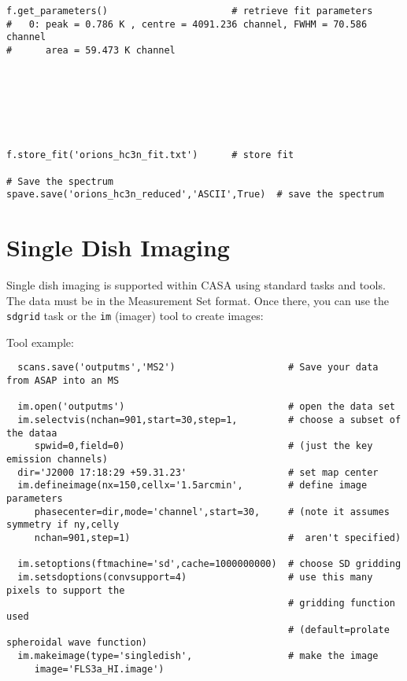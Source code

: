 \small
\begin{verbatim}
f.get_parameters()                      # retrieve fit parameters
#   0: peak = 0.786 K , centre = 4091.236 channel, FWHM = 70.586 channel
#      area = 59.473 K channel
                                                                                        
                                                                                        
                                                                                        
                                                                                        
                                                                                        
                                                                                        

f.store_fit('orions_hc3n_fit.txt')      # store fit                                     

# Save the spectrum
spave.save('orions_hc3n_reduced','ASCII',True)  # save the spectrum                     
\end{verbatim}
\normalsize

\section{Single Dish Imaging}
\label{section:sd.imaging}

Single dish imaging is supported within CASA using standard
tasks and tools. The data must be in the Measurement Set format. Once
there, you can use the {\tt sdgrid} task or the {\tt im} (imager) tool
to create images:

Tool example:

\small
\begin{verbatim}
  scans.save('outputms','MS2')                    # Save your data from ASAP into an MS

  im.open('outputms')                             # open the data set
  im.selectvis(nchan=901,start=30,step=1,         # choose a subset of the dataa   
     spwid=0,field=0)                             # (just the key emission channels) 
  dir='J2000 17:18:29 +59.31.23'                  # set map center                
  im.defineimage(nx=150,cellx='1.5arcmin',        # define image parameters
     phasecenter=dir,mode='channel',start=30,     # (note it assumes symmetry if ny,celly 
     nchan=901,step=1)                            #  aren't specified)
                                                                       
  im.setoptions(ftmachine='sd',cache=1000000000)  # choose SD gridding                
  im.setsdoptions(convsupport=4)                  # use this many pixels to support the 
                                                  # gridding function used
                                                  # (default=prolate spheroidal wave function)
  im.makeimage(type='singledish',                 # make the image
     image='FLS3a_HI.image') 
\end{verbatim}
\normalsize

